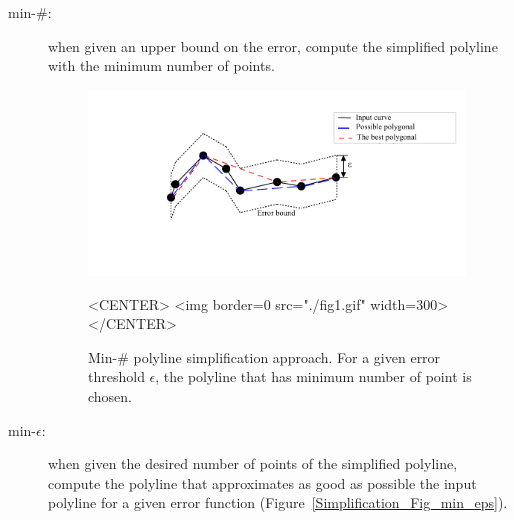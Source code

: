 \begin{description} 

\item[min-$\#$:] when given an upper bound on the error, compute the simplified polyline
with the minimum number of points.

\begin{figure}[h]
\begin{ccTexOnly}
\begin{center}
\includegraphics[width=10cm]{Polygonal_approximation_d/fig2} 
\end{center}
\end{ccTexOnly}
\caption{Min-$\#$ polyline simplification approach.
                    For a given error threshold $\epsilon$, the polyline 
                 that has minimum number of point is chosen.
\label{Simplification_Fig_min_nr}}
\begin{ccHtmlOnly}
<CENTER>
<img border=0 src="./fig1.gif" width=300>
</CENTER>
\end{ccHtmlOnly}
\end{figure}



\item[min-$\epsilon$:] when given the desired number of points of 
the simplified polyline, compute the polyline that approximates as
good as possible the input polyline for a given error function
(Figure~\ref{Simplification_Fig_min_eps}).


\end{description}
